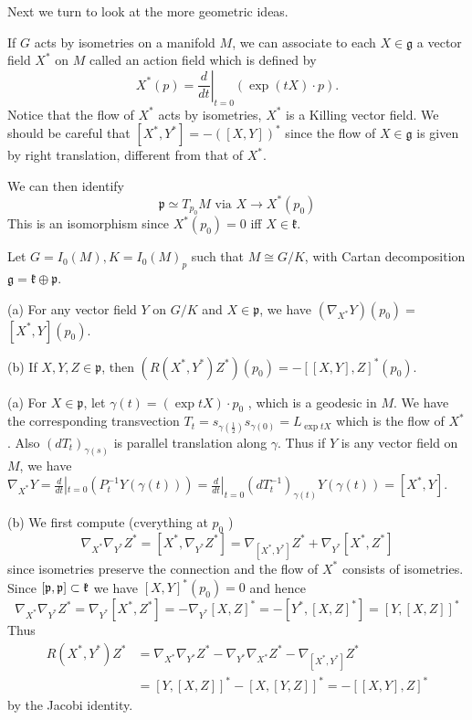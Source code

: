 Next we turn to look at the more geometric ideas.

If $G$ acts by isometries on a manifold $M$, we can associate to
each $X \in \mathfrak{g}$ a vector field $X^{*}$ on $M$ called an
action field which is defined by
\[
X^{*}(p) = \left.\frac{d}{d t}\right|_{t=0}(\exp (t X) \cdot p) .
\]
Notice that the flow of $X^*$ acts by isometries, $X^*$ is a
Killing vector field. We should be careful that $\left[X^{*},
Y^{*}\right] = -([X, Y])^{*}$ since  the flow of $X \in
\mathfrak{g}$ is given by right translation, different from that
of $X^*$. 

We can then identify
\[
\mathfrak{p} \simeq T_{p_{0}} M \text { via } X \rightarrow
X^{*}\left(p_{0}\right)
\]
This is an isomorphism since $X^{*}\left(p_{0}\right) = 0$ iff $X
\in \mathfrak{k}$.

\begin{proposition}\label{geo}
	Let $G = I_0(M), K = I_0(M)_p$ such that $M\cong G/K$, with
	Cartan decomposition $\mathfrak{g} = \mathfrak{k} \oplus
	\mathfrak{p}$.
	
	(a) For any vector field $Y$ on $G / K$ and $X \in
	\mathfrak{p}$, we have $\left( \nabla_{X^*}  Y \right)\left(
	p_{0} \right)=$
	$\left[ X^{*}, Y \right]\left( p_{0} \right) .$
	
	(b) If $X, Y, Z \in \mathfrak{p}$, then $\left( R\left(
	X^{*}, Y^{*} \right) Z^{*} \right)\left( p_{0} \right)=-[[X,
	Y], Z]^{*}\left( p_{0} \right)$.
\end{proposition}
\bproof
(a) For $X \in \mathfrak{p}$, let $\gamma(t)=(\exp t X) \cdot
p_{0}$ , which is a geodesic in $M$. We have the corresponding
transvection $T_{t}=s_{\gamma(\frac{1}{2})} s_{\gamma(0)} =
{L_{\exp t X}}$ which is the flow of $X^*$.  Also $\left(d
T_{t}\right)_{\gamma(s)}$
 is parallel translation along $\gamma$.  Thus if $ Y$  is any
 vector field on $M$, we have  $\nabla_{X^*} Y = \frac{d}{d
 t}|_{t=0} \left( P_{t}^{-1} Y(\gamma(t)) \right) = \frac{d}{d
 t}|_{t=0}\left( d T_{t}^{-1} \right)_{\gamma(t)}
 Y(\gamma(t))=\left[ X^{*}, Y \right]$.
 
 (b) We first compute (cverything at $p_{0}$ )
 \[
 \nabla_{X^*} \nabla_{Y^*} Z^{*} = \left[X^{*}, \nabla_{Y^*}
 Z^{*}\right] = \nabla_{\left[X^{*}, Y^*\right]}
 Z^{*}+\nabla_{Y^*}\left[X^{*}, Z^{*}\right]
 \]
 since isometries preserve the connection and the flow of $X^{*}$
 consists of isometries. Since $[{\mathfrak p}, {\mathfrak p}] \subset
 \mathfrak{k}$ we have $[X, Y]^{*}\left(p_{0}\right)=0$ and hence
 \[\nabla_{X^*} \nabla_{Y^*} Z^{*}=\nabla_{Y^{*}} \left[X^{*},
 Z^{*}\right]=-\nabla_{Y^*}[X, Z]^{*}=-\left[Y^{*},[X,
 Z]^{*}\right]=[Y,[X, Z]]^{*}
 \]
 Thus
 \[
 \begin{aligned}
 	R\left(X^{*}, Y^{*}\right) Z^{*} &=\nabla_{X^*} \nabla_{Y^*}
 	Z^{*}-\nabla_{Y^*} \nabla_{X^*} Z^{*}-\nabla_{\left[X^{*},
 	Y^{*}\right]} Z^{*} \\
 	&=[Y,[X, Z]]^{*}-[X,[Y, Z]]^{*}=-[[X, Y], Z]^{*}
 \end{aligned}
 \]
 by the Jacobi identity.
\eproof

